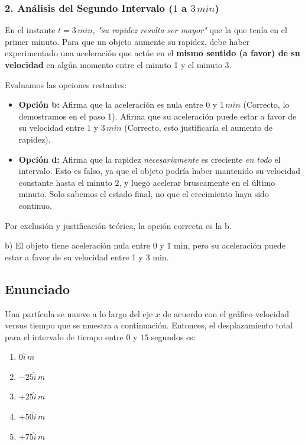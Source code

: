 \documentclass[12pt, a4paper]{article}
\begin{document}
\subsubsection*{2. Análisis del Segundo Intervalo ($1$ a $3 \, \si{min}$)}
En el instante $t = 3 \, \si{min}$, \textit{"su rapidez resulta ser mayor"} que la que tenía en el primer minuto.
Para que un objeto aumente su rapidez, debe haber experimentado una aceleración que actúe en el \textbf{mismo sentido (a favor) de su velocidad} en algún momento entre el minuto 1 y el minuto 3.

Evaluamos las opciones restantes:
\begin{itemize}
    \item \textbf{Opción b:} Afirma que la aceleración es nula entre $0$ y $1 \, \si{min}$ (Correcto, lo demostramos en el paso 1). Afirma que su aceleración puede estar a favor de su velocidad entre $1$ y $3 \, \si{min}$ (Correcto, esto justificaría el aumento de rapidez).
    \item \textbf{Opción d:} Afirma que la rapidez \textit{necesariamente} es creciente \textit{en todo} el intervalo. Esto es falso, ya que el objeto podría haber mantenido su velocidad constante hasta el minuto $2$, y luego acelerar bruscamente en el último minuto. Solo sabemos el estado final, no que el crecimiento haya sido continuo.
\end{itemize}

Por exclusión y justificación teórica, la opción correcta es la b.

\begin{tcolorbox}[colback=green!5!white, colframe=green!50!black, title=Respuesta Final]
\centering \Large b) El objeto tiene aceleración nula entre 0 y 1 min, pero su aceleración puede estar a favor de su velocidad entre 1 y 3 min.
\end{tcolorbox}

\newpage

\subsection*{Enunciado}
Una partícula se mueve a lo largo del eje $x$ de acuerdo con el gráfico velocidad versus tiempo que se muestra a continuación. Entonces, el desplazamiento total para el intervalo de tiempo entre $0$ y $15$ segundos es:

\begin{enumerate}[label=\alph*)]
    \item $0\hat{i} \, \si{m}$
    \item $-25\hat{i} \, \si{m}$
    \item $+25\hat{i} \, \si{m}$
    \item $+50\hat{i} \, \si{m}$
    \item $+75\hat{i} \, \si{m}$
\end{enumerate}
\end{document}
